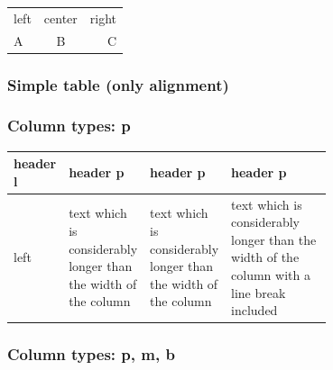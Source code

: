 \begin{filecontents*}{\democodefile}
\begin{tabular}{lcr} 
left  &  center  &  right  \\  %
A     &  B       &  C  \\
\end{tabular}
\end{filecontents*}

\subsubsection{Simple table (only alignment)}
\label{sec:simpletable}
%

\subsubsection{Column types: p}

\begin{filecontents*}{\democodefile}
\begin{center}
\small\renewcommand{\arraystretch}{1.4}
\begin{tabular}{|l|p{0.1\linewidth}|p{0.2\linewidth}|p{0.4\linewidth}|}
\hline
header l & header p & header p & header p \\ \hline
%
left  &
text which is considerably longer than the width of the column & 
text which is considerably longer than the width of the column & 
text which is considerably longer than the width of the column 
\newline with a line break included \\ \hline
\end{tabular}
\end{center}
\end{filecontents*}

%

\subsubsection{Column types: p, m, b}

